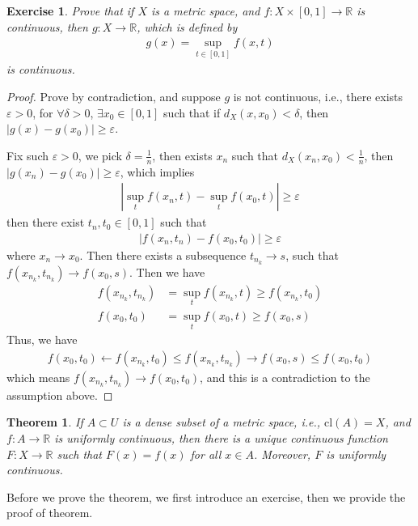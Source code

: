 \documentclass[12pt,leqno]{amsart}
\newtheorem{theorem}{Theorem}[section]
\newtheorem{exercise}{Exercise}[section]
\theoremstyle{definition}
\numberwithin{equation}{subsection}
\begin{document}
\begin{exercise}
Prove that if $X$ is a metric space, and $f:X\times[0,1]\to\mathbb{R}$ is continuous, then $g:X\to\mathbb{R}$, which is defined by 
\begin{align*}
    g(x) = \sup_{t\in[0,1]}f(x,t)
\end{align*}
is continuous.
\end{exercise}
\begin{proof}
Prove by contradiction, and suppose $g$ is not continuous, i.e., there exists $\varepsilon > 0$, for $\forall \delta > 0$, $\exists x_0 \in[0,1]$ such that if $d_X(x,x_0) < \delta$, then $|g(x) - g(x_0)|\geq\varepsilon$. 

Fix such $\varepsilon > 0$, we pick $\delta = \frac{1}{n}$, then exists $x_n$ such that $d_X(x_n,x_0) < \frac{1}{n}$, then $|g(x_n) - g(x_0)| \geq \varepsilon$, which implies
\begin{align*}
    \left|\sup_t f(x_n,t) - \sup_t f(x_0,t)\right| \geq \varepsilon
\end{align*}
then there exist $t_n, t_0\in[0,1]$ such that 
\begin{align*}
    \left|f(x_n,t_n) - f(x_0,t_0)\right| \geq \varepsilon
\end{align*}
where $x_n\to x_0$. Then there exists a subsequence $t_{n_k}\to s$, such that $f(x_{n_k},t_{n_k})\to f(x_0,s)$. Then we have 
\begin{align*}
    f(x_{n_k},t_{n_k}) & = \sup_t f(x_{n_k},t) \geq f(x_{n_k},t_0) \\
    f(x_0,t_0) & = \sup_t f(x_0,t) \geq f(x_0,s) 
\end{align*}
Thus, we have 
\begin{align*}
    f(x_0,t_0) \leftarrow f(x_{n_k},t_0) \leq f(x_{n_k},t_{n_k}) \rightarrow f(x_0,s) \leq f(x_0,t_0)
\end{align*}
which means $f(x_{n_k},t_{n_k})\to f(x_0,t_0)$, and this is a contradiction to the assumption above.
\end{proof}

\begin{theorem}
If $A\subset U$ is a dense subset of a metric space, i.e., $\text{cl}(A) = X$, and $f:A\to\mathbb{R}$ is uniformly continuous, then there is a unique continuous function $F:X\to\mathbb{R}$ such that $F(x) = f(x)$ for all $x\in A$. Moreover, $F$ is uniformly continuous.
\end{theorem}

Before we prove the theorem, we first introduce an exercise, then we provide the proof of theorem.
\end{document}
